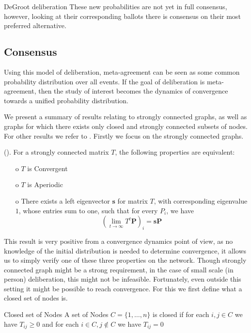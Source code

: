 \begin{example}{DeGroot deliberation}
    These new probabilities are not yet in full consensus, however, looking at their corresponding ballots there is consensus on their most preferred alternative.
    \label{example:deGroot-delib}
\end{example}

\subsection{Consensus}
\label{sub: concensus DeGroot}
Using this model of deliberation, meta-agreement can be seen as some common probability distribution over all events. If the goal of deliberation is meta-agreement, then the study of interest becomes the dynamics of convergence towards a unified probability distribution.

We present a summary of results relating to strongly connected graphs, as well as graphs for which there exists only closed and strongly connected subsets of nodes. For other results we refer to \citet{golubNaiveLearningSocial2010}. Firstly we focus on the strongly connected graphs.

\begin{proposition}{(\citet{golubNaiveLearningSocial2010}).}
    For a strongly connected matrix \(T\), the following properties are equivalent:
    \begin{itemize}
        \item[o] \(T\) is Convergent
        \item[o] \(T\) is Aperiodic
        \item[o] There exists a left eigenvector \(\boldsymbol{s}\) for matrix \(T\), with corresponding eigenvalue \(1\), whose entries sum to one, such that for every $P_i$, we have
            \[\left(\lim_{t\to \infty}T^{t} \boldsymbol{P}\right)_{i} = \boldsymbol{s}\boldsymbol{P}\]
    \end{itemize}
\end{proposition}

This result is very positive from a convergence dynamics point of view, as no knowledge of the initial distribution is needed to determine convergence, it allows us to simply verify one of these three properties on the network. Though strongly connected graph might be a strong requirement, in the case of small scale (in person) deliberation, this might not be infeasible. Fortunately, even outside this setting it might be possible to reach convergence. For this we first define what a closed set of nodes is.

\begin{definition}{Closed set of Nodes}{}
    A set of Nodes \(C = \{1, \dots, n\}\) is closed if for each \(i,j \in C\) we have $T_{ij} \geq 0$ and for each \(i \in C, j \notin C\) we have \(T_{ij} = 0\)
\end{definition}

